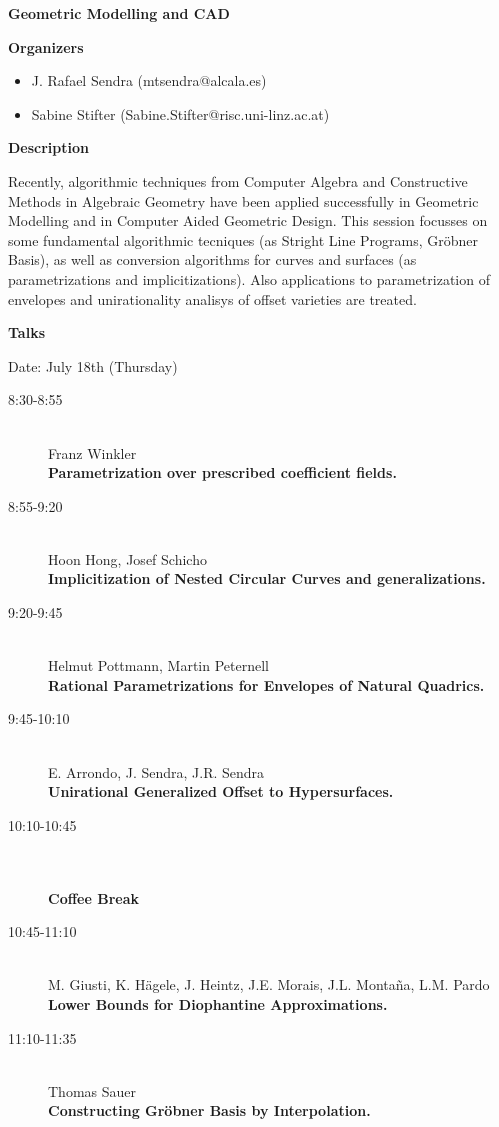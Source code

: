 \begin{center}
{\LARGE \bf Geometric Modelling and CAD}
\end{center}
\bigskip

{\bf Organizers}
\begin{itemize}
\item
J. Rafael Sendra (mtsendra@alcala.es)


\item
Sabine Stifter (Sabine.Stifter@risc.uni-linz.ac.at)

\end{itemize}
\medskip

\bigskip

{\bf Description}
\medskip

Recently, algorithmic techniques from Computer Algebra and Constructive Methods in Algebraic
Geometry have been applied successfully in Geometric Modelling and in Computer Aided
Geometric Design. This session focusses on some fundamental algorithmic tecniques (as Stright
Line Programs, Gr\"obner Basis), as well as conversion algorithms for curves and surfaces (as
parametrizations and implicitizations). Also applications to parametrization of envelopes and
unirationality analisys of offset varieties are treated. 

\bigskip
{\bf Talks}
\medskip

Date: July 18th (Thursday) 

\begin{description}
\item[8:30-8:55] \ \\
  Franz Winkler\\
  {\bf Parametrization over prescribed coefficient fields.
} 
\item[8:55-9:20] \ \\
  Hoon Hong, Josef Schicho
\\
  {\bf Implicitization of Nested Circular Curves and generalizations.
} 
\item[9:20-9:45] \ \\
  Helmut Pottmann, Martin Peternell
\\
  {\bf Rational Parametrizations for Envelopes of Natural Quadrics.
} 
\item[9:45-10:10] \ \\
  E. Arrondo, J. Sendra, J.R. Sendra\\
  {\bf Unirational Generalized Offset to Hypersurfaces.
} 
\item[10:10-10:45] \ \\
  \\
  {\bf Coffee Break 
} 
\item[10:45-11:10] \ \\
  M. Giusti, K. H\"agele, J. Heintz, J.E. Morais, J.L. Monta\~na, L.M. Pardo
\\
  {\bf Lower Bounds for Diophantine Approximations.
} 
\item[11:10-11:35] \ \\
  Thomas Sauer\\
  {\bf Constructing Gr\"obner Basis by Interpolation.
} 
\end{description}

